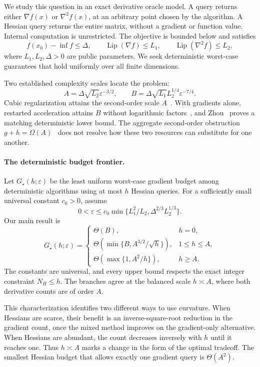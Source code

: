 \documentclass[11pt]{article}
\theoremstyle{remark}
\theoremstyle{remark}
\newcommand{\eps}{\varepsilon}
\newcommand{\Lip}{\operatorname{Lip}}
\begin{document}
We study this question in an exact derivative oracle model. A query returns
either $\nabla f(x)$ or $\nabla^2f(x)$, at an arbitrary point chosen by the
algorithm. A Hessian query returns the entire matrix, without a gradient or
function value. Internal computation is unrestricted. The objective is
bounded below and satisfies
\[
 f(x_0)-\inf f\le\Delta,\qquad
 \Lip(\nabla f)\le L_1,\qquad
 \Lip(\nabla^2f)\le L_2,
\]
where $L_1,L_2,\Delta>0$ are public parameters. We seek deterministic
worst-case guarantees that hold uniformly over all finite dimensions.

Two established complexity scales locate the problem:
\[
 A=\Delta\sqrt{L_2}\eps^{-3/2},
 \qquad
 B=\Delta\sqrt{L_1}L_2^{1/4}\eps^{-7/4}.
\]
Cubic regularization attains the second-order scale $A$~\cite{nesterov}.
With gradients alone, restarted acceleration attains $B$ without
logarithmic factors~\cite{lilin}, and Zhou~\cite{zhou} proves a matching
deterministic lower bound. The aggregate second-order obstruction
$g+h=\Omega(A)$~\cite{carmon} does not resolve how these two resources can
substitute for one another.

\paragraph{The deterministic budget frontier.}
Let $G_\star(h;\eps)$ be the least uniform worst-case gradient budget
among deterministic algorithms using at most $h$ Hessian queries. For a
sufficiently small universal constant $c_0>0$, assume
\[
 0<\eps\le c_0\min\{L_1^2/L_2,\Delta^{2/3}L_2^{1/3}\}.
\]
Our main result is
\begin{equation}\label{eq:intro-frontier}
 G_\star(h;\eps)=
 \begin{cases}
 \Theta(B),&h=0,\\[2pt]
 \Theta\!\left(\min\{B,A^{3/2}/\sqrt h\}\right),&1\le h\le A,\\[2pt]
 \Theta\!\left(\max\{1,A^2/h\}\right),&h\ge A.
 \end{cases}
\end{equation}
The constants are universal, and every upper bound respects the exact
integer constraint $N_H\le h$. The branches agree at the balanced scale
$h\asymp A$, where both derivative counts are of order $A$.

This characterization identifies two different ways to use curvature.
When Hessians are scarce, their benefit is an inverse-square-root
reduction in the gradient count, once the mixed method improves on the
gradient-only alternative. When Hessians are abundant, the count decreases
inversely with $h$ until it reaches one. Thus $h\asymp A$ marks a change
in the form of the optimal tradeoff. The smallest Hessian budget that
allows exactly one gradient query is $\Theta(A^2)$.
\end{document}
